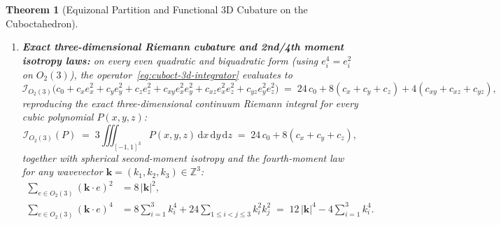 \documentclass[11pt,a4paper]{article}
\theoremstyle{plain}
\newtheorem{theorem}{Theorem}[section]
\theoremstyle{definition}
\begin{document}
\begin{theorem}[Equizonal Partition and Functional 3D Cubature on the Cuboctahedron]
\begin{enumerate}[label=\textbf{(\roman*)},leftmargin=*]
\item \textbf{Exact three-dimensional Riemann cubature and 2nd/4th moment isotropy laws:}
  on every even quadratic and biquadratic form (using $e_i^4 = e_i^2$ on $O_2(3)$), the operator~\eqref{eq:cuboct-3d-integrator} evaluates to
  \begin{equation}
    \label{eq:unified-even-cubature}
    \mathcal{I}_{O_2(3)}\!\bigl(c_0 + c_x e_x^2 + c_y e_y^2 + c_z e_z^2 + c_{xy} e_x^2 e_y^2 + c_{xz} e_x^2 e_z^2 + c_{yz} e_y^2 e_z^2\bigr)
    \;=\; 24\,c_0 + 8(c_x + c_y + c_z) + 4(c_{xy} + c_{xz} + c_{yz}),
  \end{equation}
  reproducing the exact three-dimensional continuum Riemann integral for every cubic polynomial $P(x, y, z)$:
  \begin{equation}
    \label{eq:riemann-3d-exact}
    \mathcal{I}_{O_2(3)}(P) \;=\; 3\iiint_{[-1,1]^3} P(x, y, z)\,\mathrm{d}x\,\mathrm{d}y\,\mathrm{d}z \;=\; 24\,c_0 + 8(c_x + c_y + c_z),
  \end{equation}
  together with spherical second-moment isotropy and the fourth-moment law for any wavevector $\mathbf{k} = (k_1, k_2, k_3) \in \mathbb{Z}^3$:
  \begin{align}
    \sum_{e \in O_2(3)} (\mathbf{k}\cdot e)^2 &= 8\,|\mathbf{k}|^2, \label{eq:cuboct-isotropy-2} \\
    \sum_{e \in O_2(3)} (\mathbf{k}\cdot e)^4 &= 8\sum_{i=1}^3 k_i^4 + 24\sum_{1\le i<j\le 3} k_i^2 k_j^2 \;=\; 12\,|\mathbf{k}|^4 - 4\sum_{i=1}^3 k_i^4. \label{eq:cuboct-isotropy-4}
  \end{align}
\end{enumerate}
\end{theorem}
\end{document}
